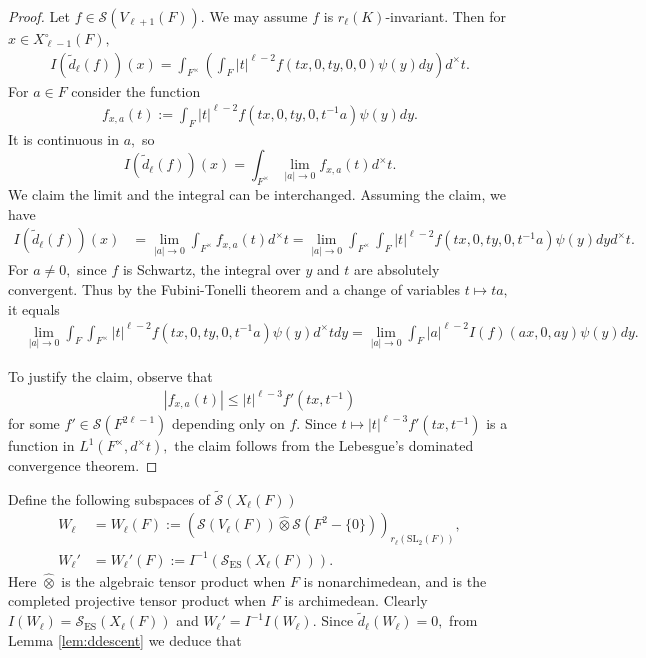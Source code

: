 \documentclass[11pt,a4paper,reqno]{amsart}
\theoremstyle{remark}
\numberwithin{equation}{section}
\newcommand{\SL}{\mathrm{SL}}
\theoremstyle{definition}
\numberwithin{equation}{section}
\renewcommand{\hat}{\widehat}
\begin{document}
\begin{proof}
Let $f\in \mathcal{S}(V_{\ell+1}(F)).$ We may assume $f$ is $r_\ell(K)$-invariant. Then for $x\in X_{\ell-1}^\circ(F),$ 
\begin{align*}
    I(\tilde{d}_\ell(f))(x)=\int_{F^\times}\left(\int_{F} |t|^{\ell-2} f(tx,0,ty,0,0)\psi(y)dy\right) d^\times t.
\end{align*}
For $a\in F$ consider the function
\begin{align*}
    f_{x,a}(t):=\int_{F} |t|^{\ell-2} f(tx,0,ty,0,t^{-1}a)\psi(y)dy.
\end{align*}
It is continuous in $a,$ so $$ I(\tilde{d}_\ell(f))(x)=\int_{F^\times}\lim_{|a|\to 0} f_{x,a}(t)d^\times t.$$ We claim the limit and the integral can be interchanged. Assuming the claim, we have
\begin{align*}
    I(\tilde{d}_\ell(f))(x)&=\lim_{|a|\to 0}\int_{F^\times}f_{x,a}(t)d^\times t =\lim_{|a|\to 0}\int_{F^\times}\int_{F} |t|^{\ell-2} f(tx,0,ty,0,t^{-1}a)\psi(y)dyd^\times t.
\end{align*}
For $a\neq 0,$ since $f$ is Schwartz, the integral over $y$ and $t$ are absolutely convergent. Thus by the Fubini-Tonelli theorem and a change of variables $t\mapsto ta,$ it equals
\begin{align*}
    &\lim_{|a|\to 0}\int_{F}\int_{F^\times} |t|^{\ell-2} f(tx,0,ty,0,t^{-1}a)\psi(y)d^\times tdy=\lim_{|a|\to 0}\int_{F} |a|^{\ell-2}I(f)(ax,0,ay) \psi(y)dy.
\end{align*}

To justify the claim, observe that
\begin{align*}
    |f_{x,a}(t)|\le |t|^{\ell-3}f'(tx,t^{-1})
\end{align*}
for some $f'\in \mathcal{S}(F^{2\ell-1})$ depending only on $f$. Since $t\mapsto |t|^{\ell-3}f'(tx,t^{-1})$ is a function in $L^1(F^\times, d^\times t),$ the claim follows from the Lebesgue's dominated convergence theorem.  
\end{proof}

Define the following subspaces of $\widetilde{\mathcal{S}}(X_\ell(F))$
\begin{align*}
    W_\ell&=W_\ell(F):=\left(\mathcal{S}(V_\ell(F))\hat{\otimes} \mathcal{S}(F^2-\{0\})\right)_{r_\ell(\SL_2(F))},\\
    W_\ell'&=W_\ell'(F):=I^{-1}(\mathcal{S}_{\mathrm{ES}}(X_\ell(F))).
\end{align*}
Here $\hat{\otimes}$ is the algebraic tensor product when $F$ is nonarchimedean, and is the completed projective tensor product when $F$ is archimedean. Clearly $I(W_\ell)=\mathcal{S}_{\mathrm{ES}}(X_\ell(F))$ and $W_\ell'=I^{-1}I(W_\ell).$ Since $\tilde{d}_\ell(W_\ell)=0,$ from Lemma \ref{lem:ddescent} we deduce that
\end{document}
